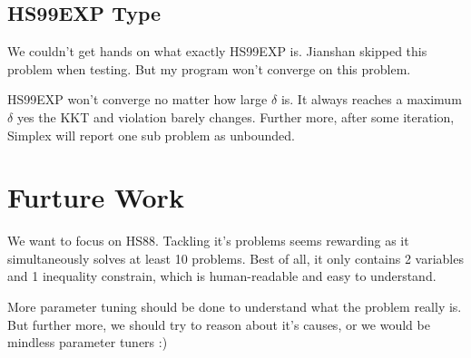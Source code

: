 \documentclass[10pt]{article}
\begin{document}
	\subsection{HS99EXP Type}
		We couldn't get hands on what exactly HS99EXP is. Jianshan skipped this problem when testing. But my program won't converge on this problem. \par
		HS99EXP won't converge no matter how large $\delta$ is. It always reaches a maximum $\delta$ yes the KKT and violation barely changes. Further more, after some iteration, Simplex will report one sub problem as unbounded.

\section{Furture Work}

	\par We want to focus on HS88. Tackling it's problems seems rewarding as it simultaneously solves at least 10 problems. Best of all, it only contains 2 variables and 1 inequality constrain, which is human-readable and easy to understand.
	\par More parameter tuning should be done to understand what the problem really is. But further more, we should try to reason about it's causes, or we would be mindless parameter tuners :) 
\end{document}
